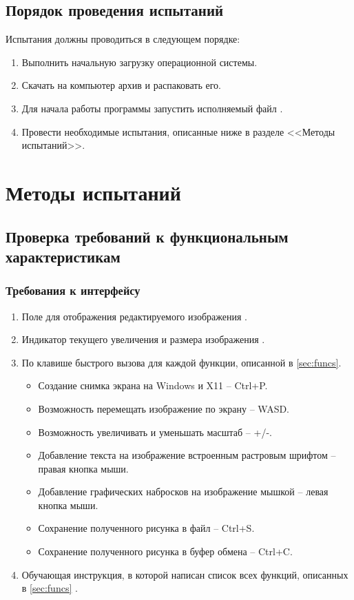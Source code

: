 \documentclass[a4paper,12pt]{article}
\begin{document}
  \subsection{Порядок проведения испытаний}
  Испытания должны проводиться в следующем порядке:
  \begin{enumerate}
    \item Выполнить начальную загрузку операционной системы.
    \item Скачать на компьютер архив \CRTzip{} и распаковать его.
    \item Для начала работы программы запустить исполняемый файл \CRTexe{}.
    \item Провести необходимые испытания, описанные ниже в разделе <<Методы испытаний>>.
  \end{enumerate}

  \newpage
  \section{Методы испытаний}
  \subsection{Проверка требований к функциональным характеристикам}
  \subsubsection{Требования к интерфейсу}
  \begin{enumerate}
    \item Поле для отображения редактируемого изображения .
    \item Индикатор текущего увеличения и размера изображения .
    \item По клавише быстрого вызова для каждой функции, описанной в \autoref{sec:funcs}.
    \begin{itemize}
      \item Создание снимка экрана на Windows и X11 -- Ctrl+P.
      \item Возможность перемещать изображение по экрану -- WASD.
      \item Возможность увеличивать и уменьшать масштаб -- +/-.
      \item Добавление текста на изображение встроенным растровым шрифтом -- правая кнопка мыши.
      \item Добавление графических набросков на изображение мышкой -- левая кнопка мыши.
      \item Сохранение полученного рисунка в файл -- Ctrl+S.
      \item Сохранение полученного рисунка в буфер обмена -- Ctrl+C.
    \end{itemize}
    \item Обучающая инструкция, в которой написан список всех функций, описанных в \autoref{sec:funcs} .
  \end{enumerate}
\end{document}
